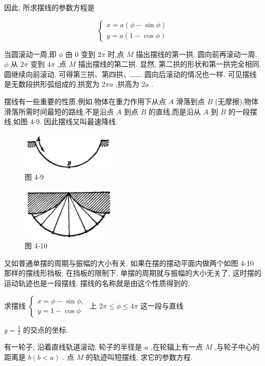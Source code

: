 \documentclass[lang=cn,newtx,10pt,scheme=chinese]{elegantbook}
\begin{document}
因此, 所求摆线的参数方程是

\[
  \left\{ \begin{array}{l} x = a\left( {\phi - \sin \phi }\right) \\ y = a\left( {1 - \cos \phi }\right) \end{array}\right.
\]

当圆滚动一周,即 \(\phi\) 由 0 变到 \({2\pi }\) 时,点 \(M\) 描出摆线的第一拱. 圆向前再滚动一周, \(\phi\) 从 \({2\pi }\) 变到 \({4\pi }\) ,点 \(M\) 描出摆线的第二拱. 显然, 第二拱的形状和第一拱完全相同. 圆继续向前滚动, 可得第三拱、第四拱、……. 圆向后滚动的情况也一样. 可见摆线是无数段拱形弧组成的,拱宽为 \({2\pi a}\) ,拱高为 \({2a}\) .

摆线有一些重要的性质,例如,物体在重力作用下从点 \(A\) 滑落到点 \(B\) (无摩擦),物体滑落所需时间最短的路线,不是沿点 \(A\) 到点 \(B\) 的直线,而是沿从 \(A\) 到 \(B\) 的一段摆线,如图 4-9. 因此摆线又叫最速降线.

\begin{figure}[h]
  \centering
  \includegraphics[max width=0.4\textwidth]{images/01912cc2-ffb6-728e-9ae7-b113ff05c64b_170_643449.jpg}
  \caption{图 4-9}
\end{figure}



\begin{figure}[h]
  \centering
  \includegraphics[max width=0.4\textwidth]{images/01912cc2-ffb6-728e-9ae7-b113ff05c64b_170_567819.jpg}
  \caption{图 4-10}
\end{figure}



又如普通单摆的周期与振幅的大小有关. 如果在摆的摆动平面内做两个如图 4-10 那样的摆线形挡板; 在挡板的限制下, 单摆的周期就与振幅的大小无关了, 这时摆的运动轨迹也是一段摆线. 摆线的名称就是由这个性质得到的.

\begin{problemset}[练习]

\item 求摆线 \(\left\{ \begin{array}{l} x = \phi - \sin \phi , \\ y = 1 - \cos \phi \end{array}\right.\) 上 \({2\pi } \leq \phi \leq {4\pi }\) 这一段与直线

\(y = \frac{3}{2}\) 的交点的坐标.

\item 有一轮子, 沿着直线轨道滚动, 轮子的半径是 \(a\) ,在轮辐上有一点 \(M\) ,与轮子中心的距离是 \(b\left( {b < a}\right)\) . 点 \(M\) 的轨迹叫短摆线, 求它的参数方程.

\end{problemset}
\end{document}
